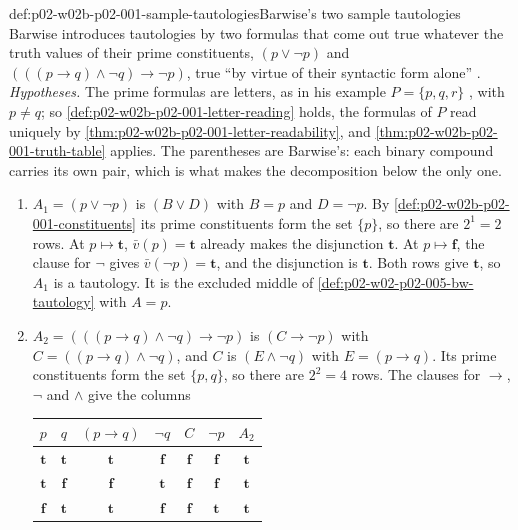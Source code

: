 \begin{hbexample}{def:p02-w02b-p02-001-sample-tautologies}{Barwise's two sample tautologies}
Barwise introduces tautologies by two formulas that come out true whatever
the truth values of their prime constituents, \((p\lor\neg p)\) and
\((((p\to q)\land\neg q)\to\neg p)\), true ``by virtue of their syntactic
form alone'' \cite[ch.~A.1, \S4, p.~24]{Barwise1977FirstOrder}.
\emph{Hypotheses.}  The prime formulas are letters, as in his example
\(P=\{p,q,r\}\) \cite[ch.~A.1, \S4, p.~23]{Barwise1977FirstOrder}, with
\(p\neq q\); so \cref{def:p02-w02b-p02-001-letter-reading} holds, the
formulas of \(P\) read uniquely by
\cref{thm:p02-w02b-p02-001-letter-readability}, and
\cref{thm:p02-w02b-p02-001-truth-table} applies.  The parentheses are
Barwise's: each binary compound carries its own pair, which is what makes
the decomposition below the only one.
\begin{enumerate}
\item \(A_1=(p\lor\neg p)\) is \((B\lor D)\) with \(B=p\) and
      \(D=\neg p\).  By \cref{def:p02-w02b-p02-001-constituents} its prime
      constituents form the set \(\{p\}\), so there are \(2^1=2\) rows.
      At \(p\mapsto\mathbf t\), \(\bar v(p)=\mathbf t\) already makes the
      disjunction \(\mathbf t\).  At \(p\mapsto\mathbf f\), the clause for
      \(\neg\) gives \(\bar v(\neg p)=\mathbf t\), and the disjunction is
      \(\mathbf t\).  Both rows give \(\mathbf t\), so \(A_1\) is a
      tautology.  It is the excluded middle of
      \cref{def:p02-w02-p02-005-bw-tautology} with \(A=p\).
\item \(A_2=(((p\to q)\land\neg q)\to\neg p)\) is \((C\to\neg p)\) with
      \(C=((p\to q)\land\neg q)\), and \(C\) is \((E\land\neg q)\) with
      \(E=(p\to q)\).  Its prime constituents form the set \(\{p,q\}\), so
      there are \(2^2=4\) rows.  The clauses for \(\to\), \(\neg\) and
      \(\land\) give the columns
      \begin{center}
      \begin{tabular}{cc|ccccc}
      \(p\) & \(q\) & \((p\to q)\) & \(\neg q\) & \(C\) & \(\neg p\) & \(A_2\)\\
      \hline
      \(\mathbf t\) & \(\mathbf t\) & \(\mathbf t\) & \(\mathbf f\) & \(\mathbf f\) & \(\mathbf f\) & \(\mathbf t\)\\
      \(\mathbf t\) & \(\mathbf f\) & \(\mathbf f\) & \(\mathbf t\) & \(\mathbf f\) & \(\mathbf f\) & \(\mathbf t\)\\
      \(\mathbf f\) & \(\mathbf t\) & \(\mathbf t\) & \(\mathbf f\) & \(\mathbf f\) & \(\mathbf t\) & \(\mathbf t\)\\

\end{tabular}
\end{center}
\end{enumerate}
\end{hbexample}
